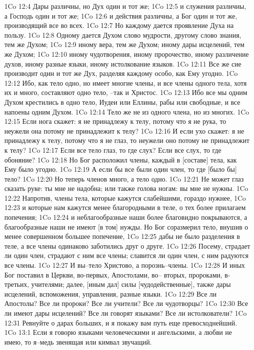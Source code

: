 1Co 12:4  Дары различны, но Дух один и тот же;
1Co 12:5  и служения различны, а Господь один и тот же;
1Co 12:6  и действия различны, а Бог один и тот же, производящий все во всех.
1Co 12:7  Но каждому дается проявление Духа на пользу.
1Co 12:8  Одному дается Духом слово мудрости, другому слово знания, тем же Духом;
1Co 12:9  иному вера, тем же Духом; иному дары исцелений, тем же Духом;
1Co 12:10  иному чудотворения, иному пророчество, иному различение духов, иному разные языки, иному истолкование языков.
1Co 12:11  Все же сие производит один и тот же Дух, разделяя каждому особо, как Ему угодно.
1Co 12:12  Ибо, как тело одно, но имеет многие члены, и все члены одного тела, хотя их и много, составляют одно тело, --так и Христос.
1Co 12:13  Ибо все мы одним Духом крестились в одно тело, Иудеи или Еллины, рабы или свободные, и все напоены одним Духом.
1Co 12:14  Тело же не из одного члена, но из многих.
1Co 12:15  Если нога скажет: я не принадлежу к телу, потому что я не рука, то неужели она потому не принадлежит к телу?
1Co 12:16  И если ухо скажет: я не принадлежу к телу, потому что я не глаз, то неужели оно потому не принадлежит к телу?
1Co 12:17  Если все тело глаз, то где слух? Если все слух, то где обоняние?
1Co 12:18  Но Бог расположил члены, каждый в [составе] тела, как Ему было угодно.
1Co 12:19  А если бы все были один член, то где [было бы] тело?
1Co 12:20  Но теперь членов много, а тело одно.
1Co 12:21  Не может глаз сказать руке: ты мне не надобна; или также голова ногам: вы мне не нужны.
1Co 12:22  Напротив, члены тела, которые кажутся слабейшими, гораздо нужнее,
1Co 12:23  и которые нам кажутся менее благородными в теле, о тех более прилагаем попечения;
1Co 12:24  и неблагообразные наши более благовидно покрываются, а благообразные наши не имеют [в том] нужды. Но Бог соразмерил тело, внушив о менее совершенном большее попечение,
1Co 12:25  дабы не было разделения в теле, а все члены одинаково заботились друг о друге.
1Co 12:26  Посему, страдает ли один член, страдают с ним все члены; славится ли один член, с ним радуются все члены.
1Co 12:27  И вы--тело Христово, а порознь--члены.
1Co 12:28  И иных Бог поставил в Церкви, во-первых, Апостолами, во-- вторых, пророками, в-третьих, учителями; далее, [иным дал] силы [чудодейственные], также дары исцелений, вспоможения, управления, разные языки.
1Co 12:29  Все ли Апостолы? Все ли пророки? Все ли учители? Все ли чудотворцы?
1Co 12:30  Все ли имеют дары исцелений? Все ли говорят языками? Все ли истолкователи?
1Co 12:31  Ревнуйте о дарах больших, и я покажу вам путь еще превосходнейший.
1Co 13:1  Если я говорю языками человеческими и ангельскими, а любви не имею, то я--медь звенящая или кимвал звучащий.
